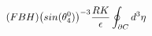 \begin{equation}
\hspace{1.5in}
(FBH)\big{(}sin(\theta_4^0)\big{)}^{-3}
\frac{RK}{\epsilon}\oint_{\partial C}d^3{\eta} 
\hspace{2.0in}
\end{equation}

